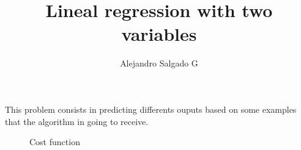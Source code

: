 \documentclass[12pt,journal]{IEEEtran}
\begin{document}
    \title{Lineal regression with two variables}
    \author{Alejandro Salgado G}
    \maketitle

    This problem consists in predicting differents ouputs based on some examples
    that the algorithm in going to receive. \\



    \begin{figure}[h]

        \centering
        \captionsetup{justification=centering}


        \caption{Cost function}
    \end{figure}
\end{document}
